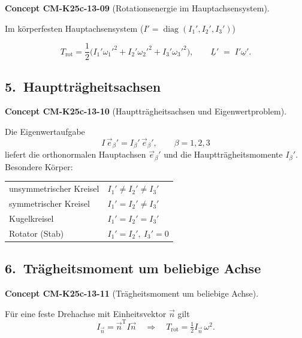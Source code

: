 \documentclass[10pt, letterpaper]{article}
\newcommand{\CustomHeading}[3]{%
  \par\medskip\noindent%
  \textbf{#1 #2} \textnormal{(#3)}.\enskip%
}
\newenvironment{CONC}[2]{\begin{unitbox}\CustomHeading{Concept}{#1}{#2}}{\end{unitbox}}
\begin{document}
\begin{CONC}{CM-K25c-13-09}{Rotationsenergie im Hauptachsensystem}
Im körperfesten Hauptachsensystem ($I'=\operatorname{diag}(I_1',I_2',I_3')$)

\[
  T_{\text{rot}}
  =\frac{1}{2}
    \bigl(I_1'\omega_1'^{2}+I_2'\omega_2'^{2}+I_3'\omega_3'^{2}\bigr),
  \qquad
  \underline L'\;=\;I'\underline\omega'.
\]
\end{CONC}

\subsection*{5.\ Hauptträgheitsachsen}

\begin{CONC}{CM-K25c-13-10}{Hauptträgheitsachsen und Eigenwertproblem}
Die Eigenwertaufgabe
\[
  I\,\vec e_\beta' = I_\beta'\,\vec e_\beta',
  \qquad \beta=1,2,3
\]
liefert die orthonormalen Hauptachsen $\vec e_\beta'$ und die
Hauptträgheitsmomente $I_\beta'$.  
Besondere Körper:

\begin{tabular}{@{}ll@{}}
unsymmetrischer Kreisel & $I_1'\neq I_2'\neq I_3'$ \\
symmetrischer Kreisel   & $I_1'=I_2'\neq I_3'$ \\
Kugelkreisel            & $I_1'=I_2'=I_3'$ \\
Rotator (Stab)          & $I_1'=I_2',\ I_3'=0$
\end{tabular}
\end{CONC}

\subsection*{6.\ Trägheitsmoment um beliebige Achse}

\begin{CONC}{CM-K25c-13-11}{Trägheitsmoment um beliebige Achse}
Für eine feste Drehachse mit Einheitsvektor $\vec n$ gilt
\[
  I_{\vec n}= \vec n^{\mathrm T} I \vec n
  \quad\Longrightarrow\quad
  T_{\text{rot}}=\tfrac12 I_{\vec n}\,\omega^{2}.
\]
\end{CONC}
\end{document}

